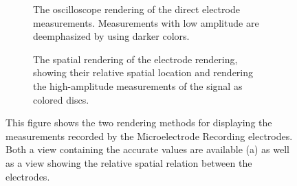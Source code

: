 \begin{figure}
\centering
    \begin{subfigure}[b]{0.49\linewidth}
        \caption{The  oscilloscope rendering of the direct electrode measurements. Measurements with low amplitude are deemphasized by using darker colors.}
        \label{contributions:medbio:dbs:sound:2d}
    \end{subfigure}
    \hfill
    \begin{subfigure}[b]{0.49\linewidth}
        \caption{The spatial  rendering of the electrode rendering, showing their relative spatial location and rendering the high-amplitude measurements of the signal as colored discs.}
        \label{contributions:medbio:dbs:sound:3d}
    \end{subfigure}
    \caption{This figure shows the two rendering methods for displaying the measurements recorded by the Microelectrode Recording electrodes. Both a view containing the accurate values are available (a) as well as a view showing the relative spatial relation between the electrodes.}
    \label{contributions:medbio:dbs:sound}
\end{figure}

